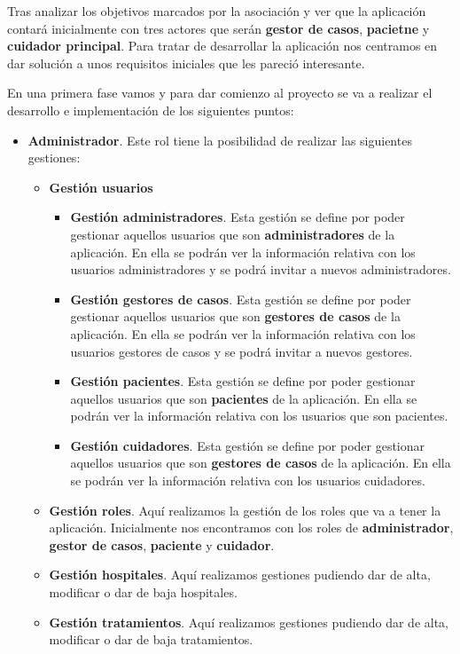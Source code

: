 Tras analizar los objetivos marcados por la asociación y ver que la aplicación contará inicialmente con tres actores que serán \textbf{gestor de casos}, \textbf{pacietne} y \textbf{cuidador principal}. Para tratar de desarrollar la aplicación nos centramos en dar solución a unos requisitos iniciales que les pareció interesante. 

En una primera fase vamos y para dar comienzo al proyecto se va a realizar el desarrollo e implementación de los siguientes puntos:
\begin{itemize}
\item \textbf{Administrador}. Este rol tiene la posibilidad de realizar las siguientes gestiones:
	\begin{itemize}
		\item \textbf{Gestión usuarios}
			\begin{itemize}
				\item \textbf{Gestión administradores}. Esta gestión se define por poder gestionar aquellos usuarios que son \textbf{administradores} de la aplicación. En ella se podrán ver la información relativa con los usuarios administradores y se podrá invitar a nuevos administradores. 
				\item \textbf{Gestión gestores de casos}. Esta gestión se define por poder gestionar aquellos usuarios que son \textbf{gestores de casos} de la aplicación. En ella se podrán ver la información relativa con los usuarios gestores de casos y se podrá invitar a nuevos gestores. 
				\item \textbf{Gestión pacientes}. Esta gestión se define por poder gestionar aquellos usuarios que son \textbf{pacientes} de la aplicación. En ella se podrán ver la información relativa con los usuarios que son pacientes. 
				\item \textbf{Gestión cuidadores}. Esta gestión se define por poder gestionar aquellos usuarios que son \textbf{gestores de casos} de la aplicación. En ella se podrán ver la información relativa con los usuarios cuidadores. 
			\end{itemize}
		\item \textbf{Gestión roles}. Aquí realizamos la gestión de los roles que va a tener la aplicación. Inicialmente nos encontramos con los roles de \textbf{administrador}, \textbf{gestor de casos}, \textbf{paciente} y \textbf{cuidador}.
		\item \textbf{Gestión hospitales}. Aquí realizamos gestiones pudiendo dar de alta, modificar o dar de baja hospitales.
		\item \textbf{Gestión tratamientos}. Aquí realizamos gestiones pudiendo dar de alta, modificar o dar de baja tratamientos.

\end{itemize}
\end{itemize}
